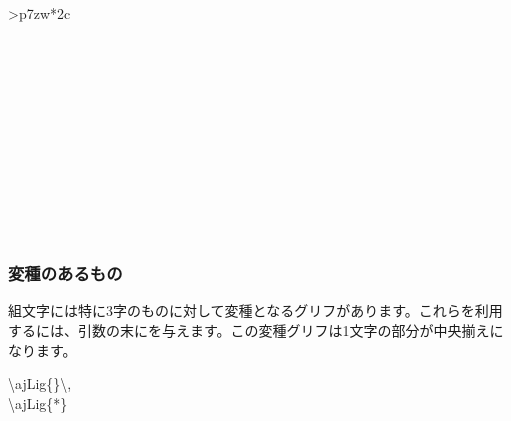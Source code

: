 \documentclass[uplatex, dvipdfmx, paper=a4paper, line_length=45zw, head_space=7zw, foot_space=10zw]{jlreq}
\newcommand{\optast}{\eghostguarded{\texttt{\textasteriskcentered}}}
\begin{document}
\begin{center}
{\begin{booktabular}{>{\ttfamily\small}p{7zw}*{2}{c}}
    \midrule
           \\
           \\
           \\
           \\
           \\
           \\
           \\
           \\
           \\
           \\
           \\
           \\
  \end{booktabular}}
\end{center}

\subsubsection{変種のあるもの}

組文字には特に3字のものに対して変種となるグリフがあります。これらを利用するには、引数の末に{\optast}を与えます。この変種グリフは1文字の部分が中央揃えになります。

\begin{demosource}
  {\textbackslash}ajLig\{\}{\textbackslash},\\
  {\textbackslash}ajLig\{*\}
  \tcblower
  \ibmfamily\LARGE
  \,
\end{demosource}
\end{document}
